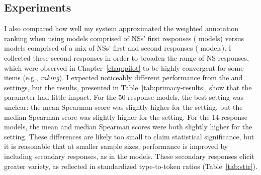 %
%


\subsection{ Experiments}
\label{sec:exp-primacy}
I also compared how well my system approximated the weighted annotation ranking when using models comprised of NSs' first responses ( models) versus models comprised of a mix of NSs' first and second responses ( models). I collected these second responses in order to broaden the range of NS responses, which were observed in Chapter~\ref{chap:pilot} to be highly convergent for some items (e.g., \textit{raking}). I expected noticeably different performance from the  and  settings, but the results, presented in Table~\ref{tab:primacy-results}, show that the parameter had little impact. For the 50-response models, the best setting was unclear: the mean Spearman score was slightly higher for the  setting, but the median Spearman score was slightly higher for the  setting. For the 14-response models, the mean and median Spearman scores were both slightly higher for the  setting. These differences are likely too small to claim statistical significance, but it is reasonable that at smaller sample sizes, performance is improved by including secondary responses, as in the  models. These secondary responses elicit greater variety, as reflected in standardized type-to-token ratios (Table~\ref{tab:sttr}).


